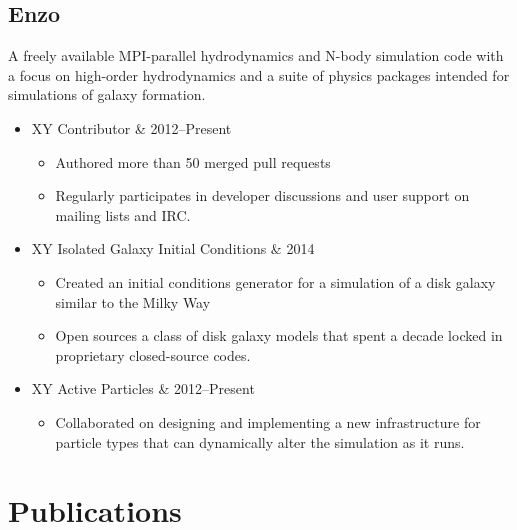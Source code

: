 \documentclass[10pt,letterpaper]{article}
\newcommand{\textline}[2]{
  \begin{tabularx}{\textwidth}{XY}
  #1 & #2
  \end{tabularx}
}
\begin{document}
\subsection*{Enzo}

A freely available MPI-parallel hydrodynamics and N-body simulation code with a
focus on high-order hydrodynamics and a suite of physics packages intended for
simulations of galaxy formation.

\begin{itemize}
\item[] \textline{Contributor}{2012--Present}
  \begin{itemize}
  \item Authored more than 50 merged pull requests
  \item Regularly participates in developer discussions and user support on mailing lists and IRC.
  \end{itemize}
\item[] \textline{Isolated Galaxy Initial Conditions}{2014}
  \begin{itemize}
  \item Created an initial conditions generator for a simulation of a disk
    galaxy similar to the Milky Way
  \item Open sources a class of disk galaxy models that spent a decade locked in
    proprietary closed-source codes.
  \end{itemize}
\item[] \textline{Active Particles}{2012--Present}
  \begin{itemize}
  \item Collaborated on designing and implementing a new infrastructure for
    particle types that can dynamically alter the simulation as it runs.
  \end{itemize}
\end{itemize}

\section*{Publications}
\end{document}
